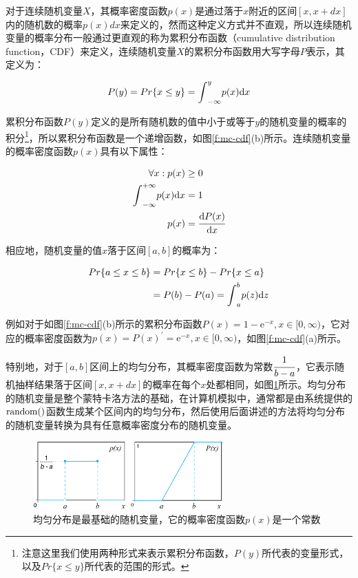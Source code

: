 对于连续随机变量$X$，其概率密度函数$p(x)$是通过落于$x$附近的区间$[x,x+dx]$内的随机数的概率$p(x)dx$来定义的，然而这种定义方式并不直观，所以连续随机变量的概率分布一般通过更直观的称为累积分布函数（cumulative distribution function，CDF）来定义，连续随机变量$X$的累积分布函数用大写字母$P$表示，其定义为：

\begin{equation}
	P(y)=Pr\{x\leq y\}={\rm \int}_{-\infty}^{y}p(x){\rm d}x
\end{equation}

累积分布函数$P(y)$定义的是所有随机数的值中小于或等于$y$的随机变量的概率的积分\footnote{注意这里我们使用两种形式来表示累积分布函数，$P(y)$所代表的变量形式，以及$Pr\{x\leq y \}$所代表的范围的形式。}，所以累积分布函数是一个递增函数，如图\ref{f:mc-cdf}(b)所示。连续随机变量的概率密度函数$p(x)$具有以下属性：

\begin{equation}\label{eq:mc-continuous-pdf}
	\begin{aligned}
		\forall x: p(x)&\geq 0\\
		{\rm \int}_{-\infty}^{+\infty}p(x){\rm d}x&=1\\
		p(x)&= \cfrac{{\rm d}P(x)}{{\rm d}x}
	\end{aligned}
\end{equation}

\noindent 相应地，随机变量的值$x$落于区间$[a,b]$的概率为：

\begin{equation}
	\begin{aligned}
		Pr\{a\leq x\leq b\}&=Pr\{x\leq b\}-Pr\{x\leq a\}\\
		&=P(b)-P(a)={\rm \int}_{a}^{b}p(z){\rm d}z
	\end{aligned}
\end{equation} 

例如对于如图\ref{f:mc-cdf}(b)所示的累积分布函数$P(x)=1-\mathrm{e}^{-x},x\in[0,\infty)$，它对应的概率密度函数为$p(x)=P(x)^{'}=\mathrm{e}^{-x},x\in[0,\infty)$，如图\ref{f:mc-cdf}(a)所示。

特别地，对于$[a,b]$区间上的均匀分布，其概率密度函数为常数$ \cfrac{1}{b-a}$，它表示随机抽样结果落于区间$[x,x+dx]$的概率在每个$x$处都相同，如图\ref{f:mc-uniform-cdf}所示。均匀分布的随机变量是整个蒙特卡洛方法的基础，在计算机模拟中，通常都是由系统提供的${\rm random}()$函数生成某个区间内的均匀分布，然后使用后面讲述的方法将均匀分布的随机变量转换为具有任意概率密度分布的随机变量。

\begin{figure}
\sidecaption
		\includegraphics[width=0.65\textwidth]{figures/mc/uniform-cdf}
	\caption{均匀分布是最基础的随机变量，它的概率密度函数$p(x)$是一个常数}
	\label{f:mc-uniform-cdf}
\end{figure}




